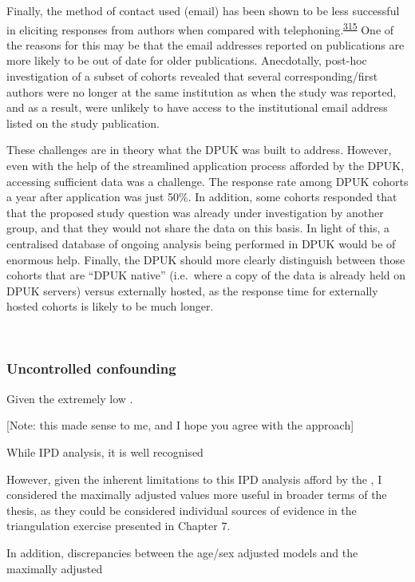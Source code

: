 \documentclass[a4paper, twoside]{templates/ociamthesis}
\begin{document}
Finally, the method of contact used (email) has been shown to be less successful in eliciting responses from authors when compared with telephoning.\textsuperscript{\protect\hyperlink{ref-danko2019}{315}} One of the reasons for this may be that the email addresses reported on publications are more likely to be out of date for older publications. Anecdotally, post-hoc investigation of a subset of cohorts revealed that several corresponding/first authors were no longer at the same institution as when the study was reported, and as a result, were unlikely to have access to the institutional email address listed on the study publication.

These challenges are in theory what the DPUK was built to address. However, even with the help of the streamlined application process afforded by the DPUK, accessing sufficient data was a challenge. The response rate among DPUK cohorts a year after application was just 50\%. In addition, some cohorts responded that that the proposed study question was already under investigation by another group, and that they would not share the data on this basis. In light of this, a centralised database of ongoing analysis being performed in DPUK would be of enormous help. Finally, the DPUK should more clearly distinguish between those cohorts that are ``DPUK native'' (i.e.~where a copy of the data is already held on DPUK servers) versus externally hosted, as the response time for externally hosted cohorts is likely to be much longer.

~

\hypertarget{uncontrolled-confounding}{%
\subsubsection{Uncontrolled confounding}\label{uncontrolled-confounding}}

Given the extremely low .

{[}Note: this made sense to me, and I hope you agree with the approach{]}

While IPD analysis, it is well recognised

However, given the inherent limitations to this IPD analysis afford by the , I considered the maximally adjusted values more useful in broader terms of the thesis, as they could be considered individual sources of evidence in the triangulation exercise presented in Chapter 7.

In addition, discrepancies between the age/sex adjusted models and the maximally adjusted
\end{document}
